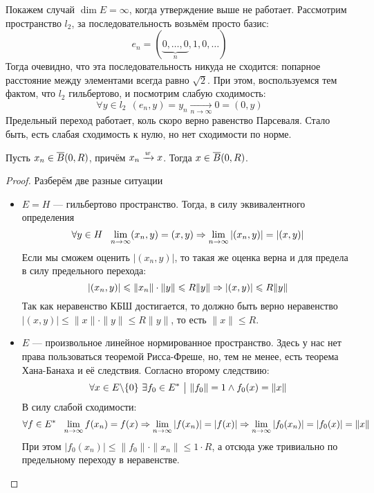 \begin{example}
	Покажем случай $\dim E = \infty$, когда утверждение выше не работает. Рассмотрим пространство $l_2$, за последовательность возьмём просто базис:
	\[
		e_n = (\underbrace{0, \ldots, 0}_{n}, 1, 0, \ldots)
	\]
	Тогда очевидно, что эта последовательность никуда не сходится: попарное расстояние между элементами всегда равно $\sqrt{2}$. При этом, воспользуемся тем фактом, что $l_2$ гильбертово, и посмотрим слабую сходимость:
	\[
		\forall y \in l_2\ \ (e_n, y) = y_n \xrightarrow[n \to \infty]{} 0 = (0, y)
	\]
	Предельный переход работает, коль скоро верно равенство Парсеваля. Стало быть, есть слабая сходимость к нулю, но нет сходимости по норме.
\end{example}

\begin{problem}
	Пусть $x_n \in \overline{B}(0, R)$, причём $x_n \xrightarrow{w} x$. Тогда $x \in \overline{B}(0, R)$.
\end{problem}

\begin{proof}
	Разберём две разные ситуации
	\begin{itemize}
		\item $E = H$ --- гильбертово пространство. Тогда, в силу эквивалентного определения
		\[
			\forall y \in H\ \ \lim_{n \to \infty} (x_n, y) = (x, y) \Rightarrow \lim_{n \to \infty} |(x_n, y)| = |(x, y)|
		\]
		Если мы сможем оценить $|(x_n, y)|$, то такая же оценка верна и для предела в силу предельного перехода:
		\[
			|(x_n, y)| \leqslant \|x_n\| \cdot \|y\| \leqslant R\|y\| \Rightarrow |(x, y)| \leqslant R\|y\|
		\]
		Так как неравенство КБШ достигается, то должно быть верно неравенство $|(x, y)| \le \|x\| \cdot \|y\| \le R\|y\|$, то есть $\|x\| \le R$.
		
		\item $E$ --- произвольное линейное нормированное пространство. Здесь у нас нет права пользоваться теоремой Рисса-Фреше, но, тем не менее, есть теорема Хана-Банаха и её следствия. Согласно второму следствию:
		\[
			\forall x \in E \backslash \{0\}\ \exists f_0 \in E^* \ \big|\  \|f_0\| = 1 \wedge f_0(x) = \|x\|
		\]
		В силу слабой сходимости:
		\[
			\forall f \in E^*\ \ \lim_{n \to \infty} f(x_n) = f(x) \Rightarrow \lim_{n \to \infty} |f(x_n)| = |f(x)| \Rightarrow \lim_{n \to \infty} |f_0(x_n)| = |f_0(x)| = \|x\|
		\]
		При этом $|f_0(x_n)| \le \|f_0\| \cdot \|x_n\| \le 1 \cdot R$, а отсюда уже тривиально по предельному переходу в неравенстве.
	\end{itemize}
\end{proof}

